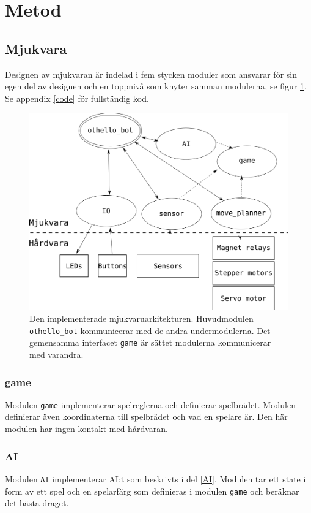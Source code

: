 \documentclass[a4paper]{article}
\begin{document}
\section{Metod}
\subsection{Mjukvara}
Designen av mjukvaran är indelad i fem stycken moduler som ansvarar för sin egen del av designen och en toppnivå som knyter samman modulerna, se figur \ref{system_arch}.
Se appendix \ref{code} för fullständig kod.
\begin{figure}\label{system_arch}
\centering
\includegraphics[scale=0.6]{system_arch}
\caption{Den implementerade mjukvaruarkitekturen. Huvudmodulen \texttt{othello\_bot} kommunicerar med de andra undermodulerna. Det gemensamma interfacet \texttt{game} är sättet modulerna kommunicerar med varandra.}
\end{figure}

\subsubsection*{game}
Modulen \texttt{game} implementerar spelreglerna och definierar spelbrädet.
Modulen definierar även koordinaterna till spelbrädet och vad en spelare är.
Den här modulen har ingen kontakt med hårdvaran.

\subsubsection*{AI}
Modulen \texttt{AI} implementerar AI:t som beskrivts i del \ref{AI}.
Modulen tar ett state i form av ett spel och en spelarfärg som definieras i modulen \texttt{game} och beräknar det bästa draget.
\end{document}
